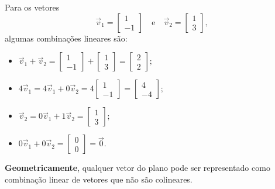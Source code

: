 \begin{ex}
Para os vetores
\begin{equation}
\vec{v}_1 = \left[
  \begin{array}{c}
    1 \\
    -1
  \end{array}
\right] \quad \text{e} \quad
\vec{v}_2 = \left[
  \begin{array}{c}
    1 \\
    3
  \end{array}
\right],
\end{equation} algumas combinações lineares são:
\begin{itemize}
  \item $\vec{v}_1 + \vec{v}_2 =
  \left[
  \begin{array}{c}
    1 \\
    -1
  \end{array}
\right] +
\left[
  \begin{array}{c}
    1 \\
    3
  \end{array}
\right] =
\left[
  \begin{array}{c}
    2 \\
    2
  \end{array}
\right];$
  \item $ 4 \vec{v}_1 = 4 \vec{v}_1 + 0 \vec{v}_2 =
  4 \left[
  \begin{array}{c}
    1 \\
    -1
  \end{array}
\right] =
\left[
  \begin{array}{c}
    4 \\
    -4
  \end{array}
\right];$
  \item $ \vec{v}_2 = 0\vec{v}_1 + 1\vec{v}_2 =
   \left[
  \begin{array}{c}
    1 \\
    3
  \end{array}
\right];$
  \item $0\vec{v}_1 + 0 \vec{v}_2 =
  \left[
  \begin{array}{c}
    0 \\
    0
  \end{array}
\right] = \vec{0}.$
\end{itemize} \textbf{Geometricamente}, qualquer vetor do plano pode ser representado como combinação linear de vetores que não são colineares.


\end{ex}
